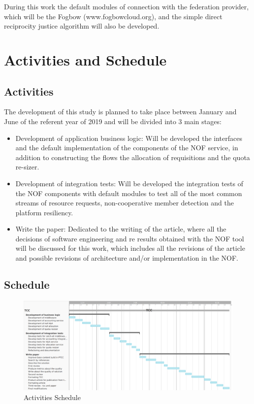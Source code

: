 \documentclass{article}
\begin{document}
During this work the default modules of connection with the federation provider, which will be the Fogbow (www.fogbowcloud.org), and the simple direct reciprocity justice algorithm will also be developed.

\section{Activities and Schedule}

\subsection{Activities}
The development of this study is planned to take place between January and June of the referent year of 2019 and will be divided into 3 main stages:

\begin{itemize}
    \item Development of application business logic: 
	Will be developed the interfaces and the default implementation of the components of the NOF service, in addition to constructing the flows the allocation of requisitions and the quota re-sizer.
	\item Development of integration tests:
	Will be developed the integration tests of the NOF components with default modules to test all of the most common streams of resource requests, non-cooperative member detection and the platform resiliency.
	\item Write the paper:
	Dedicated to the writing of the article, where all the decisions of software engineering and re results obtained with the NOF tool will be discussed for this work, which includes all the revisions of the article and possible revisions of architecture and/or implementation in the NOF.
\end{itemize}
    
\subsection{Schedule}
\begin{figure}[h!]
    \centering
    \includegraphics[scale=0.35]{./image/TCC-schedule.png}
    \caption{Activities Schedule}
\end{figure}
\end{document}
